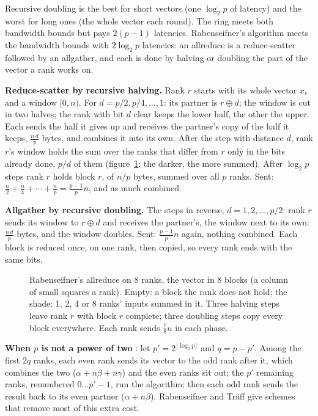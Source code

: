 \documentclass[10pt,a4paper]{article}
\theoremstyle{definition}
\begin{document}
Recursive doubling is the best for short vectors (one $\log_2 p$ of
latency) and the worst for long ones (the whole vector each round). The
ring meets both bandwidth bounds but pays $2(p-1)$ latencies.
Rabenseifner's algorithm \cite{rabenseifner} meets the bandwidth bounds
with $2\log_2 p$ latencies: an allreduce is a reduce-scatter followed by an
allgather, and each is done by halving or doubling the part of the vector
a rank works on.

\textbf{Reduce-scatter by recursive halving.} Rank $r$ starts with its whole
vector $x_r$ and a window $[0, n)$. For $d = p/2, p/4, \ldots, 1$: its
partner is $r \oplus d$; the window is cut in two halves; the rank with
bit $d$ clear keeps the lower half, the other the upper. Each sends the
half it gives up and receives the partner's copy of the half it keeps,
$\frac{n\,d}{p}$ bytes, and combines it into its own. After the step with
distance $d$, rank $r$'s window holds the sum over the ranks that differ
from $r$ only in the bits already done, $p/d$ of them
(figure~\ref{fig:rabenseifner}: the darker, the more summed). After
$\log_2 p$ steps rank $r$ holds block $r$, of $n/p$ bytes, summed over all
$p$ ranks. Sent: $\frac{n}{2} + \frac{n}{4} + \cdots + \frac{n}{p} =
\frac{p-1}{p}n$, and as much combined.

\textbf{Allgather by recursive doubling.} The steps in reverse, $d = 1, 2,
\ldots, p/2$: rank $r$ sends its window to $r \oplus d$ and receives the
partner's, the window next to its own: $\frac{n\,d}{p}$ bytes, and the
window doubles. Sent: $\frac{p-1}{p}n$ again, nothing combined. Each
block is reduced once, on one rank, then copied, so every rank ends with
the same bits.

\begin{figure}[h]
  \centering
  \begin{tikzpicture}[x=1cm, y=1cm]\end{tikzpicture}
  \caption{Rabenseifner's allreduce on 8 ranks, the vector in 8 blocks
    (a column of small squares a rank). Empty: a block the rank does not
    hold; the shade: 1, 2, 4 or 8 ranks' inputs summed in it. Three
    halving steps leave rank $r$ with block $r$ complete; three doubling
    steps copy every block everywhere. Each rank sends $\frac{7}{8}n$ in
    each phase.}
  \label{fig:rabenseifner}
\end{figure}

\textbf{When $p$ is not a power of two} \cite{thakur}: let $p' =
2^{\lfloor\log_2 p\rfloor}$ and $q = p - p'$. Among the first $2q$ ranks,
each even rank sends its vector to the odd rank after it, which combines
the two ($\alpha + n\beta + n\gamma$) and the even ranks sit out; the $p'$
remaining ranks, renumbered $0 \ldots p'-1$, run the algorithm; then each
odd rank sends the result back to its even partner ($\alpha + n\beta$).
Rabenseifner and Tr\"aff \cite{rabtraff} give schemes that remove most of
this extra cost.
\end{document}
